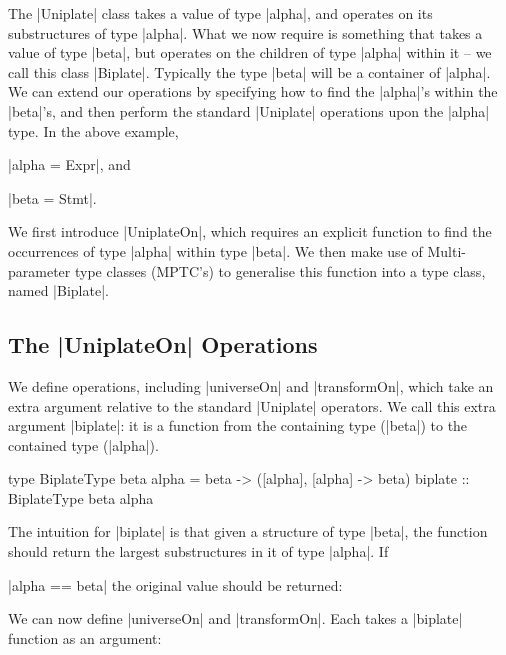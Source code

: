 The |Uniplate| class takes a value of type |alpha|, and operates on its substructures of type |alpha|. What we now require is something that takes a value of type |beta|, but operates on the children of type |alpha| within it -- we call this class |Biplate|. Typically the type |beta| will be a container of |alpha|. We can extend our operations by specifying how to find the |alpha|'s within the |beta|'s, and then perform the standard |Uniplate| operations upon the |alpha| type. In the above example, \ignore|alpha = Expr|, and \ignore|beta = Stmt|.

We first introduce |UniplateOn|, which requires an explicit function to find the occurrences of  type |alpha| within type |beta|. We then make use of Multi-parameter type classes (MPTC's) to generalise this function into a type class, named |Biplate|.

\subsection{The |UniplateOn| Operations}

We define operations, including |universeOn| and |transformOn|, which take an extra argument relative to the standard |Uniplate| operators. We call this extra argument |biplate|: it is a function from the containing type (|beta|) to the contained type (|alpha|).

\begin{comment}
\begin{code}
type BiplateType beta alpha = beta -> ([alpha], [alpha] -> beta)
\end{code}
\end{comment}

\begin{code}
type BiplateType beta alpha = beta -> ([alpha], [alpha] -> beta)
biplate :: BiplateType beta alpha
\end{code}

The intuition for |biplate| is that given a structure of type |beta|, the function should return the largest substructures in it of type |alpha|. If \ignore|alpha == beta| the original value should be returned:

\begin{code}
biplateSelf :: BiplateType alpha alpha
biplateSelf x = ([x], \[x'] -> x')
\end{code}

We can now define |universeOn| and |transformOn|. Each takes a |biplate| function as an argument:

